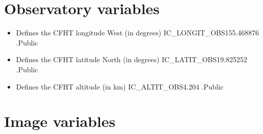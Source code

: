 \section{Observatory variables}
\label{ch:variables:observatory}

\begin{itemize}

\item {} 
{Defines the CFHT longitude West (in degrees)}
{IC\_LONGIT\_OBS}{155.468876}
{\calCCF}{\constantsfile}{\spirouRV.}{Public}

\item {} 
{Defines the CFHT latitude North (in degrees)}
{IC\_LATIT\_OBS}{19.825252}
{\calCCF}{\constantsfile}{\spirouRV.}{Public}

\item {} 
{Defines the CFHT altitude (in km)}
{IC\_ALTIT\_OBS}{4.204}
{\calCCF}{\constantsfile}{\spirouRV.}{Public}

\end{itemize}


\section{Image variables}
\label{ch:variables:image}

